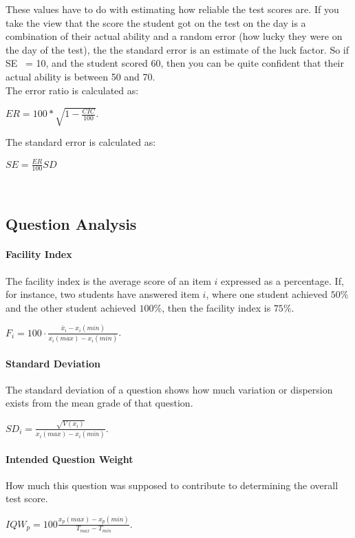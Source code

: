 \documentclass[12pt]{report}
\begin{document}
These values have to do with estimating how reliable the test scores are.
If you take the view that the score the student got on the test on the day is a combination
 of their actual ability and a random error
  (how lucky they were on the day of the test),
   the the standard error is an estimate of the luck factor. So if SE ~= 10, and the student scored 60, then you can be quite confident
    that their actual ability is between 50 and 70.\\

The error ratio is calculated as:

$ER=100*\sqrt{1-\frac{CIC}{100}}$.

The standard error is calculated as:

$SE=\frac{ER}{100}SD$

\ \\

\subsection{Question Analysis}
\label{subsubsec:questions}

\paragraph{Facility Index}
The facility index is the average score of an item $i$ expressed as a percentage. If, for instance, two students have answered item $i$, where one student achieved $50\%$ and the other student achieved $100\%$, then the facility index is $75\%$.

$F_i = 100\cdot\frac{\bar{x}_i - x_i(min)}{x_i(max) - x_i(min)}$. 

\paragraph{Standard Deviation}
The standard deviation of a question shows how much variation or dispersion exists from the mean grade of that question. 

$SD_i = \frac{\sqrt{V(x_i)}}{x_i(max) - x_i(min)}$.

\paragraph{Intended Question Weight}

How much this question was supposed to contribute to determining the overall test score.

$IQW_p = 100\frac{x_p(max) - x_p(min)}{T_{max} - T_{min}}$.\\
\end{document}
